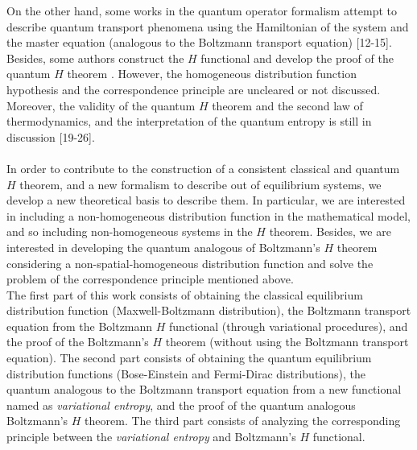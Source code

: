\documentclass{article}
\begin{document}
{On the other hand, some works in the quantum operator formalism attempt to describe quantum transport phenomena using the Hamiltonian of the system and the master equation (analogous to the Boltzmann transport equation) [12-15]. 
Besides, some authors construct the $H$ functional and develop the proof of the quantum $H$ theorem \cite{htheorem2, quantum1, quantum2}. However, the homogeneous distribution function hypothesis and the correspondence principle are uncleared or not discussed. Moreover, the validity of the quantum $H$ theorem and the second law of thermodynamics, and the interpretation of the quantum entropy is still in discussion [19-26].\\ 
\\
In order to contribute to the construction of a consistent classical and quantum $H$ theorem, and a new formalism to describe out of equilibrium systems, we develop a new theoretical basis to describe them. In particular, we are interested in including a non-homogeneous distribution function in the mathematical model, and so including non-homogeneous systems in the $H$ theorem. Besides, we are interested in developing the quantum analogous of Boltzmann's $H$ theorem considering a non-spatial-homogeneous distribution function and solve the problem of the correspondence principle mentioned above.\\
The first part of this work consists of obtaining the classical equilibrium distribution function (Maxwell-Boltzmann distribution), the Boltzmann transport equation from the Boltzmann $H$ functional (through variational procedures), and the proof of the Boltzmann's $H$ theorem (without using the Boltzmann transport equation). The second part consists of obtaining the quantum equilibrium distribution functions (Bose-Einstein and Fermi-Dirac distributions), the quantum analogous to the Boltzmann transport equation from a new functional named as \textit{variational entropy}, and the proof of the quantum analogous Boltzmann's $H$ theorem. The third part consists of analyzing the corresponding principle between the \textit{variational entropy} and Boltzmann's $H$ functional.}
\end{document}
